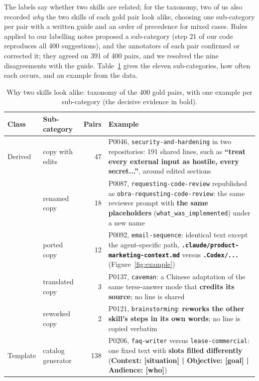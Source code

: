 \documentclass[sigconf,screen]{acmart}
\begin{document}
The labels say whether two skills are related; for the taxonomy, two of us also recorded \emph{why} the two skills of each gold pair look alike, choosing one sub-category per pair with a written guide and an order of precedence for mixed cases. Rules applied to our labelling notes proposed a sub-category (step 21 of our code reproduces all 400 suggestions), and the annotators of each pair confirmed or corrected it; they agreed on 391 of 400 pairs, and we resolved the nine disagreements with the guide. Table~\ref{tab:taxonomy} gives the eleven sub-categories, how often each occurs, and an example from the data.
 
\begin{table}[t]
\caption{Why two skills look alike: taxonomy of the 400 gold pairs, with one example per sub-category (the decisive evidence in bold).}
\label{tab:taxonomy}
\small
\begin{tabular}{>{\raggedright\arraybackslash}p{}>{\raggedright\arraybackslash}p{}r>{\raggedright\arraybackslash}p{}}
\toprule
Class & Sub-category & Pairs & Example \\
\midrule
Derived & copy with edits & 47 & P0046, \texttt{security-and-hardening} in two repositories: 191 shared lines, such as \textbf{``treat every external input as hostile, every secret...''}, around edited sections \\
 & renamed copy & 18 & P0087, \texttt{requesting-code-review} republished as \texttt{obra-requesting-code-review}: the same reviewer prompt with \textbf{the same placeholders} (\texttt{what\_was\_implemented}) under a new name \\
 & ported copy & 12 & P0092, \texttt{email-sequence}: identical text except the agent-specific path, \textbf{\texttt{.claude/product-marketing-context.md}} versus \textbf{\texttt{.Codex/...}} (Figure~\ref{fig:example}) \\
 & translated copy & 3 & P0137, \texttt{caveman}: a Chinese adaptation of the same terse-answer mode that \textbf{credits its source}; no line is shared \\
 & reworked copy & 2 & P0121, \texttt{brainstorming}: \textbf{reworks the other skill's steps in its own words}; no line is copied verbatim \\
\midrule
Template & catalog generator & 138 & P0206, \texttt{faq-writer} versus \texttt{lease-commercial}: one fixed text with \textbf{slots filled differently} (\textbf{Context: [situation] | Objective: [goal] | Audience: [who]}) \\

\end{tabular}
\end{table}
\end{document}
